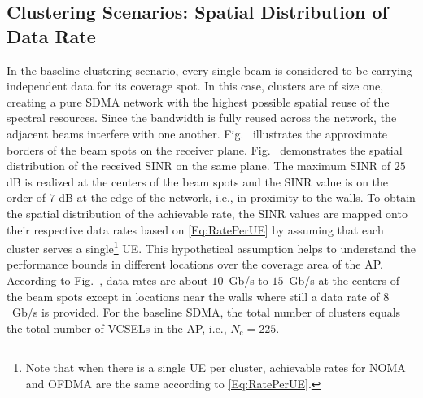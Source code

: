 \documentclass[lettersize,journal]{IEEEtran}
\begin{document}
\subsection{Clustering Scenarios: Spatial Distribution of Data Rate}
In the baseline clustering scenario, every single beam is considered to be carrying independent data for its coverage spot. In this case, clusters are of size one, creating a pure \ac{SDMA} network with the highest possible spatial reuse of the spectral resources. Since the bandwidth is fully reused across the network, the adjacent beams interfere with one another. Fig.~ illustrates the approximate borders of the beam spots on the receiver plane. Fig.~ demonstrates the spatial distribution of the received \ac{SINR} on the same plane. The maximum \ac{SINR} of $25$ dB is realized at the centers of the beam spots and the \ac{SINR} value is on the order of $7$ dB at the edge of the network, i.e., in proximity to the walls. To obtain the spatial distribution of the achievable rate, the \ac{SINR} values are mapped onto their respective data rates based on \eqref{Eq:RatePerUE} by assuming that each cluster serves a single\footnote{Note that when there is a single \ac{UE} per cluster, achievable rates for \ac{NOMA} and \ac{OFDMA} are the same according to \eqref{Eq:RatePerUE}.} \ac{UE}. This hypothetical assumption helps to understand the performance bounds in different locations over the coverage area of the \ac{AP}. According to Fig.~, data rates are about $10$~Gb/s to $15$~Gb/s at the centers of the beam spots except in locations near the walls where still a data rate of $8$~Gb/s is provided. For the baseline \ac{SDMA}, the total number of clusters equals the total number of \acp{VCSEL} in the \ac{AP}, i.e., $N_\mathrm{c}=225$.
\end{document}
